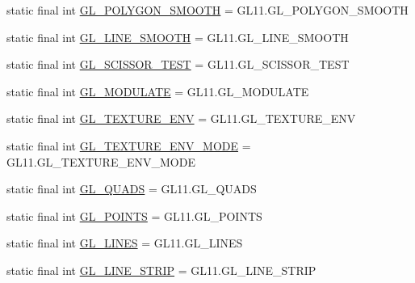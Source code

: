 \begin{DoxyCompactItemize}
static final int \mbox{\hyperlink{interfaceorg_1_1newdawn_1_1slick_1_1opengl_1_1renderer_1_1_s_g_l_a8b8d5a297f510b9b9f5e601f6fb819ce}{G\+L\+\_\+\+P\+O\+L\+Y\+G\+O\+N\+\_\+\+S\+M\+O\+O\+TH}} = G\+L11.\+G\+L\+\_\+\+P\+O\+L\+Y\+G\+O\+N\+\_\+\+S\+M\+O\+O\+TH
\item 
static final int \mbox{\hyperlink{interfaceorg_1_1newdawn_1_1slick_1_1opengl_1_1renderer_1_1_s_g_l_a6b9aa927345b297e54e5ef26bccc77bd}{G\+L\+\_\+\+L\+I\+N\+E\+\_\+\+S\+M\+O\+O\+TH}} = G\+L11.\+G\+L\+\_\+\+L\+I\+N\+E\+\_\+\+S\+M\+O\+O\+TH
\item 
static final int \mbox{\hyperlink{interfaceorg_1_1newdawn_1_1slick_1_1opengl_1_1renderer_1_1_s_g_l_a4f40b3db2d69dc9bf33187b25a37c4a7}{G\+L\+\_\+\+S\+C\+I\+S\+S\+O\+R\+\_\+\+T\+E\+ST}} = G\+L11.\+G\+L\+\_\+\+S\+C\+I\+S\+S\+O\+R\+\_\+\+T\+E\+ST
\item 
static final int \mbox{\hyperlink{interfaceorg_1_1newdawn_1_1slick_1_1opengl_1_1renderer_1_1_s_g_l_a164ddfe0b8a5e529cf949bef51e52a2b}{G\+L\+\_\+\+M\+O\+D\+U\+L\+A\+TE}} = G\+L11.\+G\+L\+\_\+\+M\+O\+D\+U\+L\+A\+TE
\item 
static final int \mbox{\hyperlink{interfaceorg_1_1newdawn_1_1slick_1_1opengl_1_1renderer_1_1_s_g_l_a5cb8d3bf11dc5ac743c74fbdc42ab234}{G\+L\+\_\+\+T\+E\+X\+T\+U\+R\+E\+\_\+\+E\+NV}} = G\+L11.\+G\+L\+\_\+\+T\+E\+X\+T\+U\+R\+E\+\_\+\+E\+NV
\item 
static final int \mbox{\hyperlink{interfaceorg_1_1newdawn_1_1slick_1_1opengl_1_1renderer_1_1_s_g_l_a2c8f2fa929133a5934c7ea97c983f56c}{G\+L\+\_\+\+T\+E\+X\+T\+U\+R\+E\+\_\+\+E\+N\+V\+\_\+\+M\+O\+DE}} = G\+L11.\+G\+L\+\_\+\+T\+E\+X\+T\+U\+R\+E\+\_\+\+E\+N\+V\+\_\+\+M\+O\+DE
\item 
static final int \mbox{\hyperlink{interfaceorg_1_1newdawn_1_1slick_1_1opengl_1_1renderer_1_1_s_g_l_aaa798db4e512e61ff2b57961aea40a69}{G\+L\+\_\+\+Q\+U\+A\+DS}} = G\+L11.\+G\+L\+\_\+\+Q\+U\+A\+DS
\item 
static final int \mbox{\hyperlink{interfaceorg_1_1newdawn_1_1slick_1_1opengl_1_1renderer_1_1_s_g_l_a0a445953a541b8815d10e33f17cb790e}{G\+L\+\_\+\+P\+O\+I\+N\+TS}} = G\+L11.\+G\+L\+\_\+\+P\+O\+I\+N\+TS
\item 
static final int \mbox{\hyperlink{interfaceorg_1_1newdawn_1_1slick_1_1opengl_1_1renderer_1_1_s_g_l_a877f7f5a1b36cffa331552997270f968}{G\+L\+\_\+\+L\+I\+N\+ES}} = G\+L11.\+G\+L\+\_\+\+L\+I\+N\+ES
\item 
static final int \mbox{\hyperlink{interfaceorg_1_1newdawn_1_1slick_1_1opengl_1_1renderer_1_1_s_g_l_af8ab7eaf935fa05c8275602928c2bc4f}{G\+L\+\_\+\+L\+I\+N\+E\+\_\+\+S\+T\+R\+IP}} = G\+L11.\+G\+L\+\_\+\+L\+I\+N\+E\+\_\+\+S\+T\+R\+IP

\end{DoxyCompactItemize}
